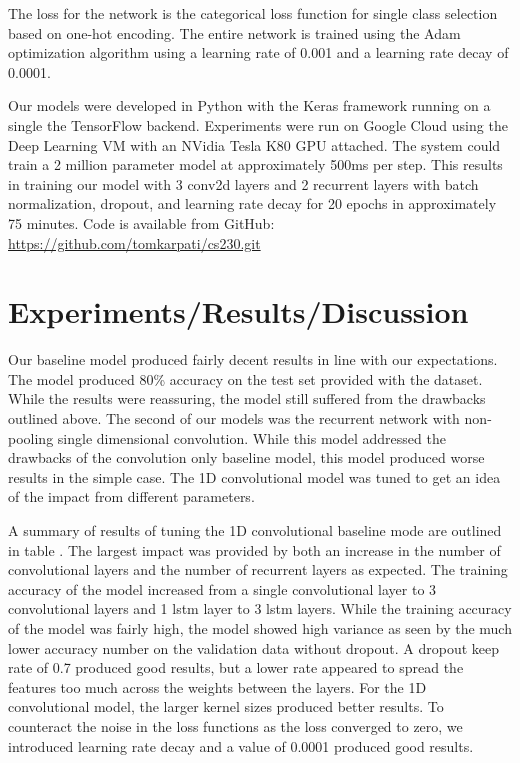 \documentclass{article}
\begin{document}
The loss for the network is the categorical loss function for single
class selection based on one-hot encoding. The entire network is
trained using the Adam optimization algorithm using a learning rate of
0.001 and a learning rate decay of 0.0001.

Our models were developed in Python with the Keras framework running
on a single the TensorFlow backend. Experiments were run on Google
Cloud using the Deep Learning VM with an NVidia Tesla K80 GPU
attached. The system could train a 2 million parameter model at
approximately 500ms per step. This results in training our model with
3 conv2d layers and 2 recurrent layers with batch normalization,
dropout, and learning rate decay for 20 epochs in approximately 75
minutes. Code is available from GitHub:
\url{https://github.com/tomkarpati/cs230.git}

\section{Experiments/Results/Discussion}
Our baseline model produced fairly decent results in line with our
expectations. The model produced 80\% accuracy on the test set
provided with the dataset. While the results were reassuring, the
model still suffered from the drawbacks outlined above. The second of
our models was the recurrent network with non-pooling single
dimensional convolution. While this model addressed the drawbacks of
the convolution only baseline model, this model produced worse results
in the simple case. The 1D convolutional model was tuned to get an
idea of the impact from different parameters.

A summary of results of tuning the 1D convolutional baseline mode are
outlined in table \cite{tab:summary-results}. The largest impact was
provided by both an increase in the number of convolutional layers and
the number of recurrent layers as expected. The training accuracy of
the model increased from a single convolutional layer to 3
convolutional layers and 1 lstm layer to 3 lstm layers. While the
training accuracy of the model was fairly high, the model showed high
variance as seen by the much lower accuracy number on the validation
data without dropout. A dropout keep rate of 0.7
produced good results, but a lower rate appeared to spread the
features too much across the weights between the layers. For the 1D
convolutional model, the larger kernel sizes produced better
results. To counteract the noise in the loss functions
as the loss converged to zero, we introduced learning rate decay and a
value of 0.0001 produced good results.
\end{document}
